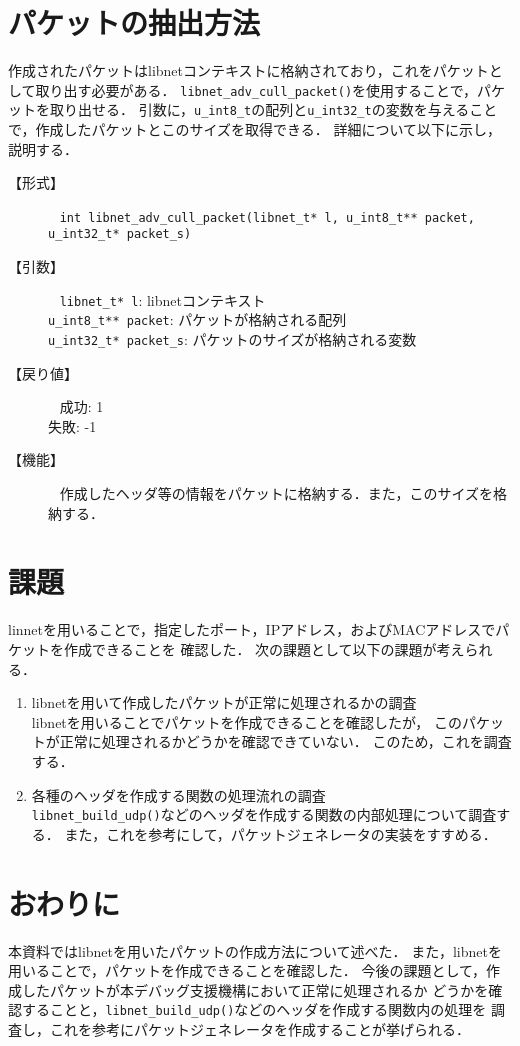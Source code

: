 \documentclass[12pt]{jsarticle}
\begin{document}
\section{パケットの抽出方法}
作成されたパケットはlibnetコンテキストに格納されており，これをパケットとして取り出す必要がある．
{\tt libnet\_adv\_cull\_packet()}を使用することで，パケットを取り出せる．
引数に，{\tt u\_int8\_t}の配列と{\tt u\_int32\_t}の変数を与えることで，作成したパケットとこのサイズを取得できる．
詳細について以下に示し，説明する．
\begin{description}
    \item[【形式】]~\newline
        {\tt int libnet\_adv\_cull\_packet(libnet\_t* l, u\_int8\_t** packet, u\_int32\_t* packet\_s)}
    \item[【引数】]~\newline
        {\tt libnet\_t* l}: libnetコンテキスト\\
        {\tt u\_int8\_t** packet}: パケットが格納される配列\\
        {\tt u\_int32\_t* packet\_s}: パケットのサイズが格納される変数\\
    \item[【戻り値】]~\newline
        成功: 1\\
        失敗: -1\\
    \item[【機能】]~\newline
        作成したヘッダ等の情報をパケットに格納する．また，このサイズを格納する．
\end{description}

\section{課題}
linnetを用いることで，指定したポート，IPアドレス，およびMACアドレスでパケットを作成できることを
確認した．
次の課題として以下の課題が考えられる．
\begin{enumerate}
    \item libnetを用いて作成したパケットが正常に処理されるかの調査\\
        libnetを用いることでパケットを作成できることを確認したが，
        このパケットが正常に処理されるかどうかを確認できていない．
        このため，これを調査する．
    \item 各種のヘッダを作成する関数の処理流れの調査\\
        {\tt libnet\_build\_udp()}などのヘッダを作成する関数の内部処理について調査する．
        また，これを参考にして，パケットジェネレータの実装をすすめる．
\end{enumerate}
\section{おわりに}
本資料ではlibnetを用いたパケットの作成方法について述べた．
また，libnetを用いることで，パケットを作成できることを確認した．
今後の課題として，作成したパケットが本デバッグ支援機構において正常に処理されるか
どうかを確認することと，{\tt libnet\_build\_udp()}などのヘッダを作成する関数内の処理を
調査し，これを参考にパケットジェネレータを作成することが挙げられる．
\end{document}
